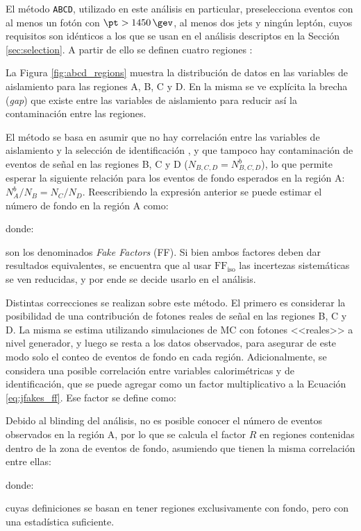El método \texttt{ABCD}, utilizado en este análisis en particular, preselecciona eventos con al menos un fotón con $\pt>1450\,\gev$, al menos dos jets y ningún leptón, cuyos requisitos son idénticos a los que se usan en el análisis descriptos en la Sección \ref{sec:selection}. A partir de ello se definen cuatro regiones \cite{ATL-COM-PHYS-2016-1626}:


La Figura \ref{fig:abcd_regions} muestra la distribución de datos en las variables de aislamiento para las regiones A, B, C y D. En la misma se ve explícita la brecha (\textit{gap}) que existe entre las variables de aislamiento para reducir así la contaminación entre las regiones.


El método se basa en asumir que no hay correlación entre las variables de aislamiento y la selección de identificación \cite{tesis_tony}, y que tampoco hay contaminación de eventos de señal en las regiones B, C y D ($N_{B,C,D}=N_{B,C,D}^b$), lo que permite esperar la siguiente relación para los eventos de fondo esperados en la región A: $N_A^b / N_B = N_C/N_D$. 
Reescribiendo la expresión anterior se puede estimar el número de fondo en la región A como:



donde:


son los denominados \textit{Fake Factors} (FF). 
Si bien ambos factores deben dar resultados equivalentes, se encuentra que al usar $\text{FF}_{\text{iso}}$ las incertezas sistemáticas se ven reducidas, y por ende se decide usarlo en el análisis.

Distintas correcciones se realizan sobre este método. El primero es considerar la posibilidad de una contribución de fotones reales de señal en las regiones B, C y D. La misma se estima utilizando simulaciones de MC con fotones <<reales>> a nivel generador, y luego se resta a los datos observados, para asegurar de este modo solo el conteo de eventos de fondo en cada región. Adicionalmente, se considera una posible correlación entre variables calorimétricas y de identificación, que se puede agregar como un factor multiplicativo a la Ecuación \ref{eq:jfakes_ff}. Ese factor se define como:


Debido al blinding del análisis, no es posible conocer el número de eventos observados en la región A, por lo que se calcula el factor $R$ en regiones contenidas dentro de la zona de eventos de fondo, asumiendo que tienen la misma correlación entre ellas:

donde:


cuyas definiciones se basan en tener regiones exclusivamente con fondo, pero con una estadística suficiente.

